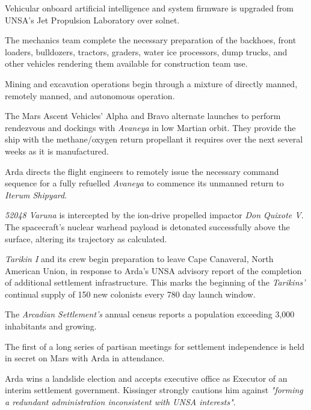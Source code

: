 Vehicular onboard artificial intelligence and system firmware is upgraded from UNSA's Jet Propulsion Laboratory over solnet.

The mechanics team complete the necessary preparation of the backhoes, front loaders, bulldozers, tractors, graders, water ice processors, dump trucks, and other vehicles rendering them available for construction team use.

Mining and excavation operations begin through a mixture of directly manned, remotely manned, and autonomous operation.
\StopTimelineDate

The Mars Ascent Vehicles' Alpha and Bravo alternate launches to perform rendezvous and dockings with {\it Avaneya} in low Martian orbit. They provide the ship with the methane/oxygen return propellant it requires over the next several weeks as it is manufactured.
\StopTimelineDate

Arda directs the flight engineers to remotely issue the necessary command sequence for a fully refuelled {\it Avaneya} to commence its unmanned return to {\it Iterum Shipyard}.
\StopTimelineDate

{\it 52048 Varuna} is intercepted by the ion-drive propelled impactor {\it Don Quixote V}. The spacecraft's nuclear warhead payload is detonated successfully above the surface, altering its trajectory as calculated.
\StopTimelineDate

{\it Tarikin I} and its crew begin preparation to leave Cape Canaveral, North American Union, in response to Arda's UNSA advisory report of the completion of additional settlement infrastructure. This marks the beginning of the {\it Tarikins'} continual supply of 150 new colonists every 780 day launch window.
\StopTimelineDate

The {\it Arcadian Settlement's} annual census reports a population exceeding 3,000 inhabitants and growing.
\StopTimelineDate

The first of a long series of partisan meetings for settlement independence is held in secret on Mars with Arda in attendance.
\StopTimelineDate

Arda wins a landslide election and accepts executive office as Executor of an interim settlement government. Kissinger strongly cautions him against {\it "forming a redundant administration inconsistent with UNSA interests"}. 

